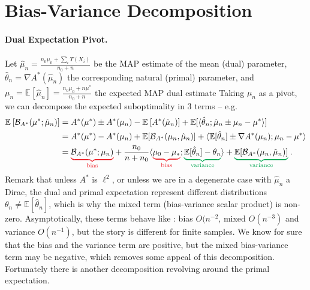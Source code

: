 \documentclass{article}
\newcommand*{\expect}[2][]{\ensuremath{\mathbb{E}_{#1} \left[ #2 \right] }} %
\newcommand{\logpart}{A}
\newcommand{\conj}{\logpart^*}
\newcommand{\bregmanconj}{\cB_{\logpart^*}}
\newcommand{\natp}{\theta}
\newcommand{\MAPm}{\hat \mu_n}
\begin{document}
\section{Bias-Variance Decomposition}
\newcommand{\bias}[1]{\textcolor{Red}{\underbrace{\textcolor{black}{#1}}_{\text{bias}}}}
\newcommand{\variance}[1]{\textcolor{Green}{\underbrace{\textcolor{black}{#1}}_{\text{variance}}}}

\paragraph{Dual Expectation Pivot.}
Let $\hat \mu_n = \frac{n_0 \mu_0 + \sum_i T(X_i)}{n_0 + n}$ be the MAP estimate of the mean (dual) parameter, $\hat \natp_n = \nabla \conj(\hat \mu_n)$ the corresponding natural (primal) parameter, and
$\mu_n = \expect{\hat \mu_n} = \frac{n_0 \mu_0 + n \mu^*}{n_0 + n}$ the expected MAP dual estimate
Taking $\mu_n$ as a pivot, we can decompose the expected suboptimality in 3 terms -- e.g. 
\begin{align}
	\expect{\bregmanconj(\mu^* ; \hat \mu_n)} 
	&= \conj(\mu^* ) 
	\pm \conj(\mu_n)
	-  \expect{\conj(\hat \mu_n)}
	+ \E[\langle \hat \natp_n ; \hat \mu_n   \pm \mu_n - \mu^*  \rangle ] 
	\nonumber \\
	&= \conj(\mu^* ) 
	- \conj(\mu_n)  + \E[\bregmanconj(\mu_n, \MAPm)]
	+ \langle \E[\hat \natp_n] \pm \nabla \conj(\mu_n) ;  \mu_n - \mu^* \rangle
	\nonumber\\
	& = \bias{\bregmanconj(\mu^*; \mu_n)}
	+ \frac{n_0}{n+n_0} \langle  \bias{\mu_0 - \mu_*} ; \variance{\E[\hat \natp_n] - \natp_n} \rangle 
	+ \variance{\E[\bregmanconj(\mu_n, \MAPm)]} \; .
	\label{eq:bias-mixed-variance}
\end{align}
Remark that unless $\conj$ is $\ell^2$, or unless we are in a degenerate case with $\hat \mu_n$ a Dirac, the dual and primal expectation represent different distributions $\theta_n \neq \expect{\hat \theta_n}$, which is why the mixed term (bias-variance scalar product) is non-zero.
Asymptotically, these terms behave like : bias $O(n^{-2}$, mixed $O(n^{-3})$ and variance $O(n^{-1})$, but the story is different for finite samples.
We know for sure that the bias and the variance term are positive, but the mixed bias-variance term may be negative, which removes some appeal of this decomposition. 
Fortunately there is another decomposition revolving around the primal expectation.

\end{document}

